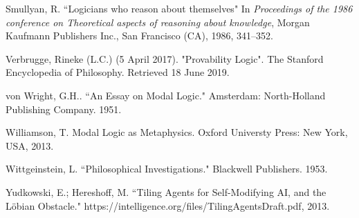\begin{thebibliography}{9}
	 	Smullyan, R. ``Logicians who reason about themselves" In \emph{Proceedings of the 1986 conference on Theoretical aspects of reasoning about knowledge}, Morgan Kaufmann Publishers Inc., San Francisco (CA), 1986, 341–352.
	 	
	 	Verbrugge, Rineke (L.C.) (5 April 2017). "Provability Logic". The Stanford Encyclopedia of Philosophy. Retrieved 18 June 2019.
	 	
	 	von Wright, G.H.. ``An Essay on Modal Logic." Amsterdam: North-Holland Publishing Company. 1951.
	 	
	 	Williamson, T. Modal Logic as Metaphysics. Oxford Universty Press: New York, USA, 2013.
	 	
	 	Wittgeinstein, L. ``Philosophical Investigations." Blackwell Publishers. 1953.
	 	
		Yudkowski, E.; Hereshoff, M. ``Tiling Agents for Self-Modifying AI, and the L\"obian Obstacle." https://intelligence.org/files/TilingAgentsDraft.pdf, 2013.	 	
\end{thebibliography}
